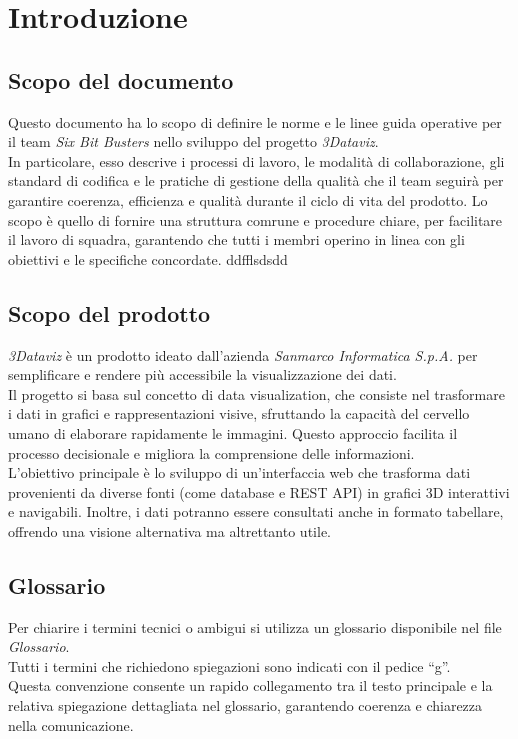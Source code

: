 \section{Introduzione}
    \subsection{Scopo del documento}
    Questo documento ha lo scopo di definire le norme e le linee guida operative per il team \textit{Six Bit Busters} nello sviluppo del progetto \textit{3Dataviz}.\\ 
    In particolare, esso descrive i processi di lavoro, le modalità di collaborazione, gli standard di codifica e le pratiche di gestione della qualità che il team seguirà per garantire coerenza, efficienza e qualità durante il ciclo di vita del prodotto. 
    Lo scopo è quello di fornire una struttura comrune e procedure chiare, per facilitare il lavoro di squadra, garantendo che tutti i membri operino in linea con gli obiettivi e le specifiche concordate.
ddfflsdsdd
    \subsection{Scopo del prodotto}
    \textit{3Dataviz} è un prodotto ideato dall'azienda \textit{Sanmarco Informatica S.p.A.} per semplificare e rendere più accessibile la visualizzazione dei dati.\\
    Il progetto si basa sul concetto di data visualization, che consiste nel trasformare i dati in grafici e rappresentazioni visive, sfruttando la capacità del cervello umano di elaborare rapidamente le immagini. 
    Questo approccio facilita il processo decisionale e migliora la comprensione delle informazioni.\\
    L’obiettivo principale è lo sviluppo di un’interfaccia web che trasforma dati provenienti da diverse fonti (come database e REST API) in grafici 3D interattivi e navigabili. 
    Inoltre, i dati potranno essere consultati anche in formato tabellare, offrendo una visione alternativa ma altrettanto utile.  

    \subsection{Glossario}
    Per chiarire i termini tecnici o ambigui si utilizza un glossario disponibile nel file \textit{Glossario}.\\
    Tutti i termini che richiedono spiegazioni sono indicati con il pedice “g”. \\
    Questa convenzione consente un rapido collegamento tra il testo principale e la relativa spiegazione dettagliata nel glossario, garantendo coerenza e chiarezza nella comunicazione.

